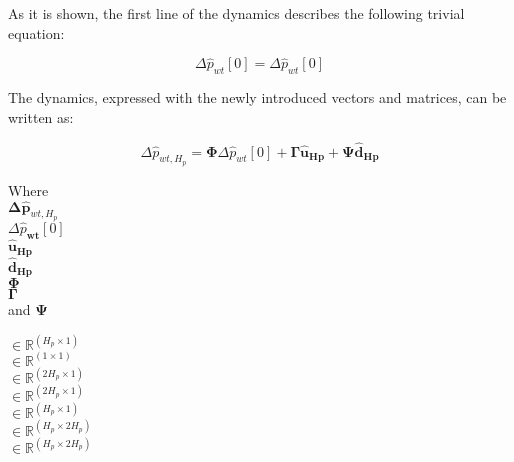 As it is shown, the first line of the dynamics describes the following trivial equation:

\begin{equation}
\Delta {\hat{p}_{wt}[0]} = \Delta {\hat{p}_{wt}[0]}
\end{equation} 

The dynamics, expressed with the newly introduced vectors and matrices, can be written as: 

\begin{equation}
	\Delta \hat{p}_{wt,H_p} = \bm{\Phi} \Delta \hat{p}_{wt}[0] + \bm{\Gamma} \bm{\hat{u}}_{\bm{Hp}} + \bm{\Psi} \bm{\hat{d}}_{\bm{Hp}}
	\label{extendedmatrix}
\end{equation}

\begin{minipage}[t]{0.15\textwidth}
Where\\
\hspace*{8mm} $\bm{\Delta \hat{p}}_{wt,H_p} $ \\\newline
\hspace*{8mm} $\Delta \hat{p}_{\bm{wt}}[0] $ \\\newline
\hspace*{8mm} $\bm{\hat{u}_{\bm{Hp}}}$ \\\newline
\hspace*{8mm} $\bm{\hat{d}_{\bm{Hp}}}$ \\\newline
\hspace*{8mm} $\bm{\Phi}$ \\\newline
\hspace*{8mm} $\bm{\Gamma}$ \\\newline
and \hspace*{0.7mm} $\bm{\Psi} $ 
\end{minipage}
\begin{minipage}[t]{0.13\textwidth}
\vspace*{2mm}
$\in \pmb{\mathbb{R}}^{(H_p \times 1)}$ \\\newline
$\in \mathbb{R}^{(1 \times 1)}$ \\\newline
$\in \pmb{\mathbb{R}}^{(2 H_p \times 1)}$ \\\newline
$\in \pmb{\mathbb{R}}^{(2 H_p \times 1)}$ \\\newline
$\in \pmb{\mathbb{R}}^{(H_p \times 1)}$ \\\newline
$\in \pmb{\mathbb{R}}^{(H_p \times 2 H_p)}$ \\\newline
$\in \pmb{\mathbb{R}}^{(H_p \times 2 H_p)}$ 
\end{minipage}
